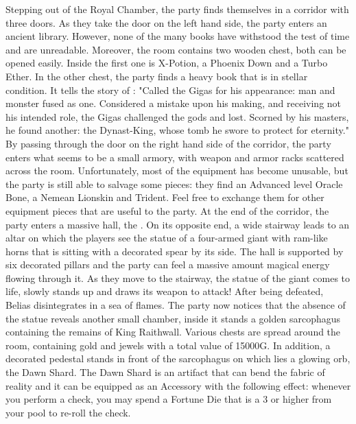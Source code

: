 %
\vfill
%
Stepping out of the Royal Chamber, the party finds themselves in a corridor with three doors.
As they take the door on the left hand side, the party enters an ancient library.
However, none of the many books have withstood the test of time and are unreadable.
Moreover, the room contains two wooden chest, both can be opened easily.
Inside the first one is X-Potion, a Phoenix Down and a Turbo Ether.
In the other chest, the party finds a heavy book that is in stellar condition.
It tells the story of :
"Called the Gigas for his appearance: man and monster fused as one. Considered a mistake upon his making, and receiving not his intended role, the Gigas challenged the gods and lost. Scorned by his masters, he found another: the Dynast-King, whose tomb he swore to protect for eternity."
By passing through the door on the right hand side of the corridor, the party enters what seems to be a small armory, with weapon and armor racks scattered across the room.
Unfortunately, most of the equipment has become unusable, but the party is still able to salvage some pieces: they find an Advanced level Oracle Bone, a Nemean Lionskin and Trident.
Feel free to exchange them for other equipment pieces that are useful to the party.
%
\clearpage
%
At the end of the corridor, the party enters a massive hall, the .
On its opposite end, a wide stairway leads to an altar on which the players see the statue of a four-armed giant with ram-like horns that is sitting with a decorated spear by its side.
The hall is supported by six decorated pillars and the party can feel a massive amount magical energy flowing through it.
As they move to the stairway, the statue of the giant comes to life, slowly stands up and draws its weapon to attack!
After being defeated, Belias disintegrates in a sea of flames.
The party now notices that the absence of the statue reveals another small chamber, inside it stands a golden sarcophagus containing the remains of King Raithwall.
Various chests are spread around the room, containing gold and jewels with a total value of 15000G.
In addition, a decorated pedestal stands in front of the sarcophagus on which lies a glowing orb, the Dawn Shard.
The Dawn Shard is an artifact that can bend the fabric of reality and it can be equipped as an Accessory with the following effect: whenever you perform a check, you may spend a Fortune Die that is a 3 or higher from your pool to re-roll the check.
%
\vfill
%
